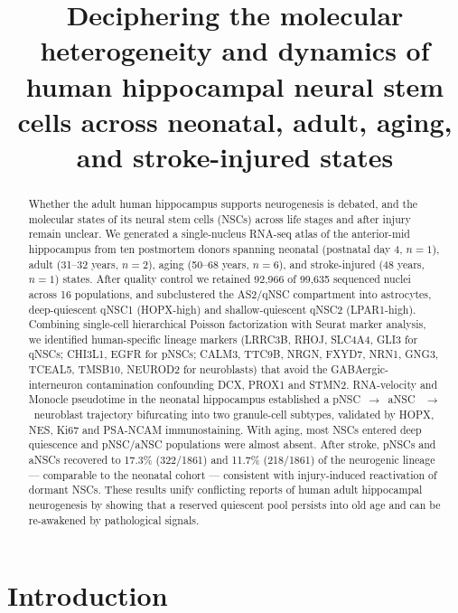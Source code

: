 \documentclass[11pt]{article}
\title{Deciphering the molecular heterogeneity and dynamics of human
hippocampal neural stem cells across neonatal, adult, aging, and
stroke-injured states}
\author[]{}
\affil[]{}
\date{}
\begin{document}
\maketitle

\begin{abstract}
Whether the adult human hippocampus supports neurogenesis is debated, and
the molecular states of its neural stem cells (NSCs) across life stages and
after injury remain unclear. We generated a single-nucleus RNA-seq atlas of
the anterior-mid hippocampus from ten postmortem donors spanning neonatal
(postnatal day 4, $n=1$), adult (31--32 years, $n=2$), aging (50--68 years,
$n=6$), and stroke-injured (48 years, $n=1$) states. After quality control
we retained 92{,}966 of 99{,}635 sequenced nuclei across 16 populations,
and subclustered the AS2/qNSC compartment into astrocytes, deep-quiescent
qNSC1 (HOPX-high) and shallow-quiescent qNSC2 (LPAR1-high). Combining
single-cell hierarchical Poisson factorization with Seurat marker analysis,
we identified human-specific lineage markers (LRRC3B, RHOJ, SLC4A4, GLI3
for qNSCs; CHI3L1, EGFR for pNSCs; CALM3, TTC9B, NRGN, FXYD7, NRN1, GNG3,
TCEAL5, TMSB10, NEUROD2 for neuroblasts) that avoid the GABAergic-interneuron
contamination confounding DCX, PROX1 and STMN2. RNA-velocity and Monocle
pseudotime in the neonatal hippocampus established a pNSC~$\rightarrow$~aNSC
~$\rightarrow$~neuroblast trajectory bifurcating into two granule-cell
subtypes, validated by HOPX, NES, Ki67 and PSA-NCAM immunostaining. With
aging, most NSCs entered deep quiescence and pNSC/aNSC populations were
almost absent. After stroke, pNSCs and aNSCs recovered to 17.3\% (322/1861)
and 11.7\% (218/1861) of the neurogenic lineage --- comparable to the
neonatal cohort --- consistent with injury-induced reactivation of dormant
NSCs. These results unify conflicting reports of human adult hippocampal
neurogenesis by showing that a reserved quiescent pool persists into old age
and can be re-awakened by pathological signals.
\end{abstract}

\section{Introduction}
\end{document}
